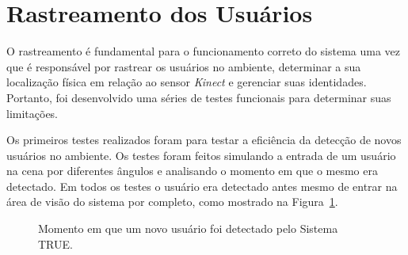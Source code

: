 \section{Rastreamento dos Usuários}

	O rastreamento é fundamental para o funcionamento correto do sistema uma vez que é responsável por rastrear os usuários no ambiente, determinar a sua localização física em relação ao sensor \textit{Kinect} e gerenciar suas identidades. Portanto, foi desenvolvido uma séries de testes funcionais para determinar suas limitações.

	Os primeiros testes realizados foram para testar a eficiência da detecção de novos usuários no ambiente. Os testes foram feitos simulando a entrada de um usuário na cena por diferentes ângulos e analisando o momento em que o mesmo era detectado. Em todos os testes o usuário era detectado antes mesmo de entrar na área de visão do sistema por completo, como mostrado na Figura~\ref{fig:testes_deteccao}.
	
		\begin{figure}[htb]
			\begin{center}
			\end{center}
			\caption{Momento em que um novo usuário foi detectado pelo Sistema TRUE.}
			\label{fig:testes_deteccao}
		\end{figure}


